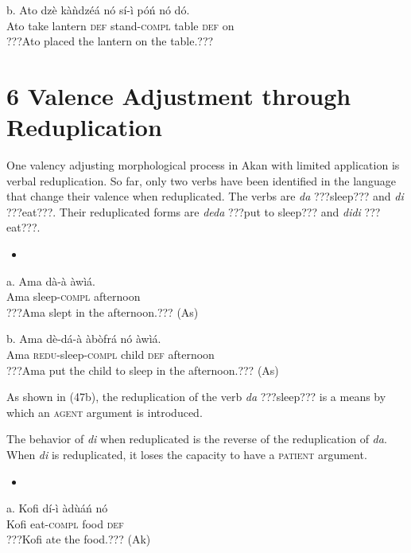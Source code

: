 \documentclass[output=paper]{langsci/langscibook}
\begin{document}
\gll  b.  Ato  dz\`{e}  k\`{a}\`{n}dz\'{e}\'{a}  n\'{o}  s\'{i}-\`{i}    p\'{o}\'{n}  n\'{o}  d\'{o}.\\
       Ato  take  lantern    \textsc{def}  stand-\textsc{compl}  table  \textsc{def}  on\\
\glt ???Ato placed the lantern on the table.???
\z

\chapter[6  Valence Adjustment through Reduplication  ]{6  Valence Adjustment through Reduplication  }

One valency adjusting morphological process in Akan with limited application is verbal reduplication. So far, only two verbs have been identified in the language that change their valence when reduplicated. The verbs are \emph{da} ???sleep??? and \emph{di} ???eat???. Their reduplicated forms are \emph{deda} ???put to sleep??? and \emph{didi} ???eat???.

\begin{itemize}
\item \end{itemize}
\gll a.  Ama  d\`{a}-\`{a}    \`{a}w\`{i}\'{a}.\\
       Ama  sleep-\textsc{compl}  afternoon\\
\glt   ???Ama slept in the afternoon.??? (As)
\z

\gll  b.  Ama  d\`{e}-d\'{a}-\`{a}    \`{a}b\`{o}fr\'{a}    n\'{o}  \`{a}w\`{i}\'{a}.\\
       Ama  \textsc{redu}{}-sleep\textsc{{}-compl}  child    \textsc{def}  afternoon\\
\glt   ???Ama put the child to sleep in the afternoon.??? (As)
\z

As shown in (47b), the reduplication of the verb \emph{da} ???sleep??? is a means by which an \textsc{agent} argument is introduced.

The behavior of \emph{di} when reduplicated is the reverse of the reduplication of \emph{da}. When \emph{di} is reduplicated, it loses the capacity to have a \textsc{patient} argument.

\begin{itemize}
\item \end{itemize}
\gll a.  Kofi  d\'{i}-\`{i}    \`{a}d\`{u}\'{a}\'{n}    n\'{o}\\
       Kofi  eat-\textsc{compl}  food    \textsc{def}\\
\glt   ???Kofi ate the food.??? (Ak)
\z
\end{document}
